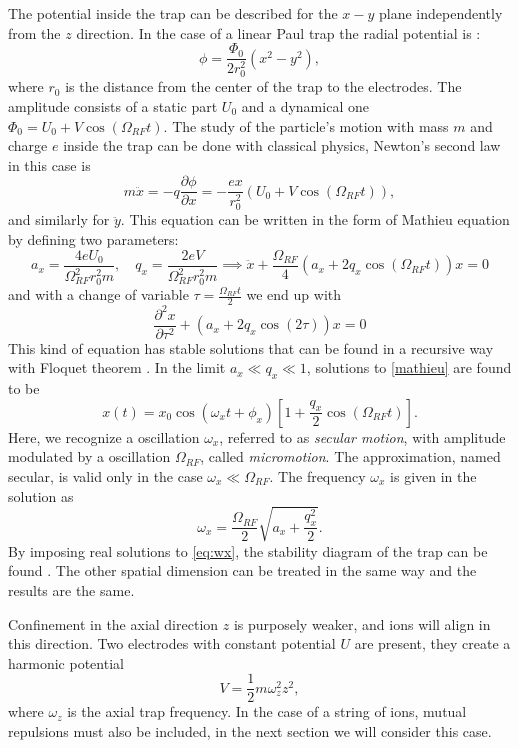 The potential inside the trap can be described for the $x-y$ plane independently from the $z$ direction. In the case of a linear Paul trap the radial potential is \cite{traptheory}:
\begin{equation}
\phi  = \frac{\Phi_0}{2r_0^2}\left(x^2 - y^2\right),
\end{equation}
where $r_0$ is the distance from the center of the trap to the electrodes. The amplitude consists of a static part $U_0$ and a dynamical one $\Phi_0 = U_0 + V \cos(\Omega_{RF} t)$.
The study of the particle's motion with mass $m$ and charge $e$ inside the trap can be done with classical physics, Newton's second law in this case is
\begin{equation}
m\ddot{x} = -q \frac{\partial \phi}{\partial x} = - \frac{ex}{r_0^2}\left(U_0 + V \cos(\Omega_{RF} t) \right),
\end{equation}
and similarly for $\ddot{y}$. This equation can be written in the form of Mathieu equation \cite{Richards1983} by defining two parameters:
\begin{equation}
a_x = \frac{4eU_0}{\Omega_{RF}^2r_0^2m}, \quad q_x = \frac{2eV}{\Omega_{RF}^2r_0^2m} \implies \ddot{x} +\frac{\Omega_{RF}}{4} \left(a_x + 2q_x \cos(\Omega_{RF} t )\right)x = 0
\end{equation}
and with a change of variable $\tau = \frac{\Omega_{RF} t}{2}$ we end up with
\begin{equation}
\label{mathieu}
\frac{\partial^2 x}{\partial \tau^2}+\left(a_x + 2q_x \cos(2\tau)\right)x = 0
\end{equation}
This kind of equation has stable solutions that can be found in a recursive way with Floquet theorem \cite{iondynamic}. In the limit $a_x \ll q_x \ll 1$, solutions to \eqref{mathieu} are found to be
\begin{equation}
x(t) = x_0 \cos(\omega_x t +\phi_x)\left[1 + \frac{q_x}{2}\cos(\Omega_{RF} t) \right].
\end{equation}
Here, we recognize a oscillation $\omega_x$, referred to as \emph{secular motion}, with amplitude modulated by a oscillation $\Omega_{RF}$, called \emph{micromotion}. The approximation, named secular, is valid only in the case $\omega_x \ll \Omega_{RF}$. The frequency $\omega_x$ is given in the solution as
\begin{equation}
\label{eq:wx}
\omega_x = \frac{\Omega_{RF}}{2}\sqrt{a_x + \frac{q_x^2}{2}}.
\end{equation}
By imposing real solutions to \eqref{eq:wx}, the stability diagram of the trap can be found \cite{traptheory}. The other spatial dimension can be treated in the same way and the results are the same.\par
Confinement in the axial direction $z$ is purposely weaker, and ions will align in this direction. Two electrodes with constant potential $U$ are present, they create a harmonic potential
\begin{equation}
V = \frac{1}{2}m\omega_z^2z^2,
\end{equation}
where $\omega_z$ is the axial trap frequency. In the case of a string of ions, mutual repulsions must also be included, in the next section we will consider this case.

